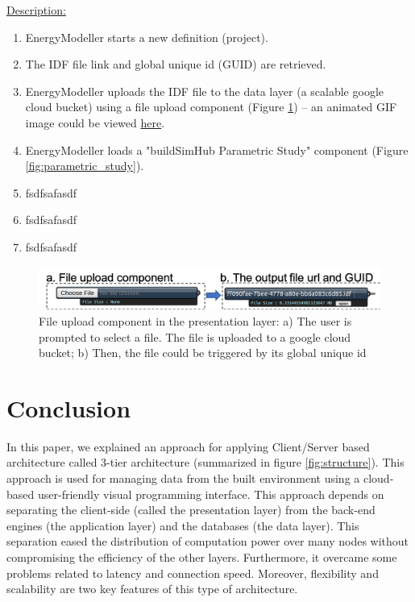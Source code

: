\documentclass{scsSimAUDPaperFormat}
\begin{document}
\underline{Description: }
\begin{enumerate}
    \item EnergyModeller starts a new definition (project).
    \item The IDF file link and global unique id (GUID) are retrieved. 
    \item EnergyModeller uploads the IDF file to the data layer (a scalable google cloud bucket) using a file upload component (Figure \ref{fig:fileupload_comp}) -- an animated GIF image could be viewed \href{https://user-images.githubusercontent.com/6969514/77833649-16c24280-717a-11ea-9df1-8a5e0f7bae83.gif}{here}.
    
    \item EnergyModeller loads a "buildSimHub Parametric Study" component (Figure \ref{fig:parametric_study}). 
    \item fsdfsafasdf
    \item fsdfsafasdf
    \item fsdfsafasdf
\end{enumerate}

\begin{figure}[h]
\includegraphics[width=\columnwidth]{paper_LateX/imgs/file_compo.png}
\caption{ File upload component in the presentation layer: a) The user is prompted to select a file. The file is uploaded to a google cloud bucket; b) Then, the file could be triggered by its global unique id}
\label{fig:fileupload_comp}
\end{figure}

\section{Conclusion}
In this paper, we explained an approach for applying Client/Server based architecture called 3-tier architecture (summarized in figure \ref{fig:structure}). This approach is used for managing data from the built environment using a cloud-based user-friendly visual programming interface. This approach depends on separating the client-side (called the presentation layer) from the back-end engines (the application layer) and the databases (the data layer). This separation eased the distribution of computation power over many nodes without compromising the efficiency of the other layers. Furthermore, it overcame some problems related to latency and connection speed. Moreover, flexibility and scalability are two key features of this type of architecture. 
\end{document}
